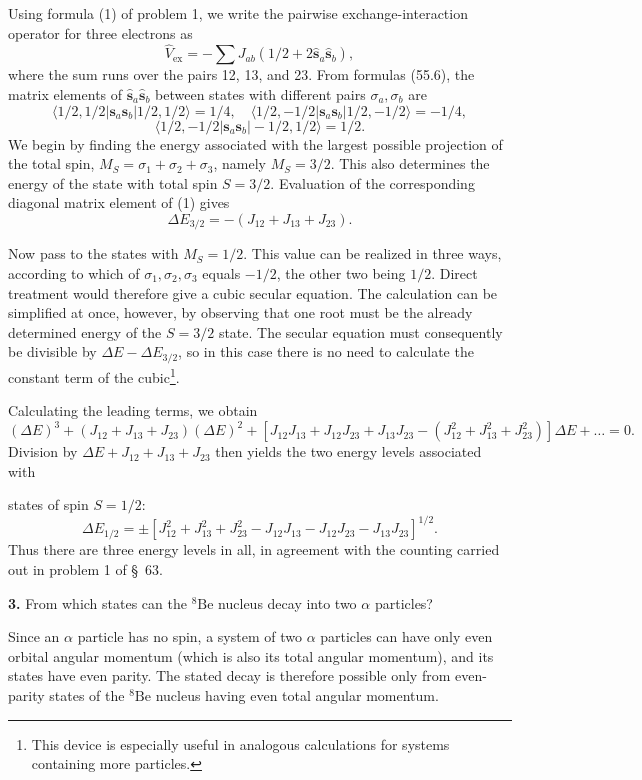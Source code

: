 \SolutionHeading Using formula (1) of problem 1, we write the pairwise exchange-interaction operator for three electrons as
\begin{equation}
 \widehat V_{\text{ex}}=-\sum J_{ab}(1/2+2\hat{\mathbf s}_a\hat{\mathbf s}_b),
 \tag{1}
\end{equation}
where the sum runs over the pairs 12, 13, and 23. From formulas (55.6), the matrix elements of $\hat{\mathbf s}_a\hat{\mathbf s}_b$ between states with different pairs $\sigma_a,\sigma_b$ are
\[
 \langle1/2,1/2|\mathbf s_a\mathbf s_b|1/2,1/2\rangle=1/4,
 \quad \langle1/2,-1/2|\mathbf s_a\mathbf s_b|1/2,-1/2\rangle=-1/4,
\]
\[
 \langle1/2,-1/2|\mathbf s_a\mathbf s_b|-1/2,1/2\rangle=1/2.
\]
We begin by finding the energy associated with the largest possible projection of the total spin, $M_S=\sigma_1+\sigma_2+\sigma_3$, namely $M_S=3/2$. This also determines the energy of the state with total spin $S=3/2$. Evaluation of the corresponding diagonal matrix element of (1) gives
\[
 \Delta E_{3/2}=-(J_{12}+J_{13}+J_{23}).
\]

Now pass to the states with $M_S=1/2$. This value can be realized in three ways, according to which of $\sigma_1,\sigma_2,\sigma_3$ equals $-1/2$, the other two being $1/2$. Direct treatment would therefore give a cubic secular equation. The calculation can be simplified at once, however, by observing that one root must be the already determined energy of the $S=3/2$ state. The secular equation must consequently be divisible by $\Delta E-\Delta E_{3/2}$, so in this case there is no need to calculate the constant term of the cubic\footnote{This device is especially useful in analogous calculations for systems containing more particles.}.

Calculating the leading terms, we obtain
\[
 (\Delta E)^3+(J_{12}+J_{13}+J_{23})(\Delta E)^2+
 [J_{12}J_{13}+J_{12}J_{23}+J_{13}J_{23}-(J_{12}^2+J_{13}^2+J_{23}^2)]\Delta E+\ldots=0.
\]
Division by $\Delta E+J_{12}+J_{13}+J_{23}$ then yields the two energy levels associated with

states of spin $S=1/2$:
\[
 \Delta E_{1/2}=\pm[J_{12}^2+J_{13}^2+J_{23}^2-J_{12}J_{13}-J_{12}J_{23}-J_{13}J_{23}]^{1/2}.
\]
Thus there are three energy levels in all, in agreement with the counting carried out in problem 1 of §~63.

\textbf{3.} From which states can the ${}^{8}\mathrm{Be}$ nucleus decay into two $\alpha$ particles?

\SolutionHeading Since an $\alpha$ particle has no spin, a system of two $\alpha$ particles can have only even orbital angular momentum (which is also its total angular momentum), and its states have even parity. The stated decay is therefore possible only from even-parity states of the ${}^{8}\mathrm{Be}$ nucleus having even total angular momentum.

